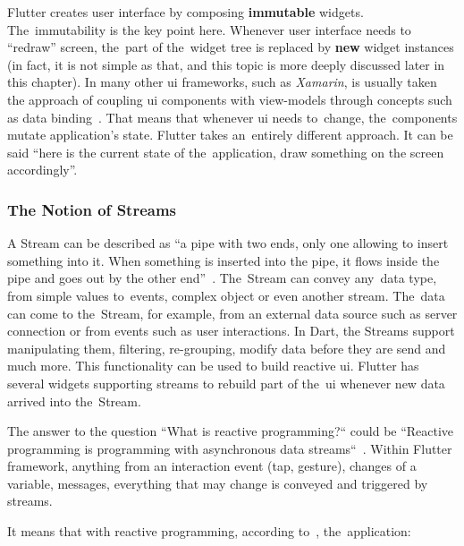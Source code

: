 Flutter creates user interface by composing \textbf{immutable} widgets. The~immutability is the key point here. Whenever user interface needs to ``redraw'' screen, the~part of the~widget tree is replaced by \textbf{new} widget instances (in fact, it is not simple as that, and this topic is more deeply discussed later in this chapter). In many other \gls{ui} frameworks, such as \textit{Xamarin}, is usually taken the approach of coupling \gls{ui} components with view-models through concepts such as data binding~\cite{xamarin-data-binding}. That means that whenever \gls{ui} needs to~change, the~components mutate application's state. Flutter takes an~entirely different approach. It can be said ``here is the current state of the~application, draw something on the screen accordingly''.

\subsubsection{The Notion of Streams}
A Stream can be described as ``a pipe with two ends, only one allowing to insert something into it. When something is inserted into the pipe, it flows inside the pipe and goes out by the other end''~\cite{reactive-didier}. The~Stream can convey any~data type, from simple values to~events, complex object or even another stream. The~data can come to the~Stream, for example, from an external data source such as server connection or from events such as user interactions. In Dart, the Streams support manipulating them, filtering, re-grouping, modify data before they are send and much more. This functionality can be used to build reactive \gls{ui}. Flutter has several widgets supporting streams to rebuild part of the~\gls{ui} whenever new data arrived into the~Stream.

The answer to the question ``What is reactive programming?`` could be ``Reactive programming is programming with asynchronous data streams``~\cite{reactive-didier}\cite{reactive-red-hat}. Within Flutter framework, anything from an interaction event (tap, gesture), changes of a variable, messages, everything that may change is conveyed and triggered by streams.

It means that with reactive programming, according to~\cite{reactive-didier}, the~application:

